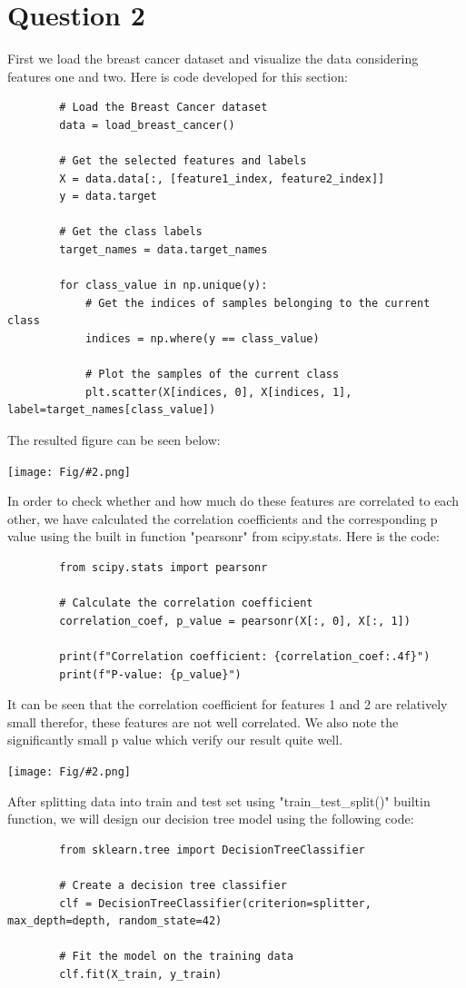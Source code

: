 \documentclass[]{article}
\newcommand{\pict}[2]{\begin{center}
		\texttt{[image: Fig/\#2.png]}
\end{center}}
\begin{document}
	\section{Question 2}
	First we load the breast cancer dataset and visualize the data considering features one and two. Here is code developed for this section:
	\begin{lstlisting}
		# Load the Breast Cancer dataset
		data = load_breast_cancer()
		
		# Get the selected features and labels
		X = data.data[:, [feature1_index, feature2_index]]
		y = data.target
		
		# Get the class labels
		target_names = data.target_names
		
		for class_value in np.unique(y):
			# Get the indices of samples belonging to the current class
			indices = np.where(y == class_value)
			
			# Plot the samples of the current class
			plt.scatter(X[indices, 0], X[indices, 1], label=target_names[class_value])
	\end{lstlisting}
	The resulted figure can be seen below:
	\pict{0.6}{F1}
	In order to check whether and how much do these features are correlated to each other, we have calculated the correlation coefficients and the corresponding p value using the built in function "pearsonr" from scipy.stats. Here is the code:
	\begin{lstlisting}
		from scipy.stats import pearsonr
		
		# Calculate the correlation coefficient
		correlation_coef, p_value = pearsonr(X[:, 0], X[:, 1])
		
		print(f"Correlation coefficient: {correlation_coef:.4f}")
		print(f"P-value: {p_value}")
	\end{lstlisting}
	It can be seen that the correlation coefficient for features 1 and 2 are relatively small therefor, these features are not well correlated. We also note the significantly small p value which verify our result quite well. 
	\pict{0.3}{F2}
	After splitting data into train and test set using "train\_test\_split()" builtin function, we will design our decision tree model using the following code:
	\begin{lstlisting}
		from sklearn.tree import DecisionTreeClassifier
		
		# Create a decision tree classifier
		clf = DecisionTreeClassifier(criterion=splitter, max_depth=depth, random_state=42)
		
		# Fit the model on the training data
		clf.fit(X_train, y_train)
	\end{lstlisting} 
\end{document}
